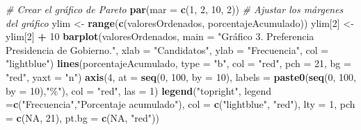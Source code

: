 \documentclass[
  12 pt,
  a4paper,
]{article}
\newenvironment{Shaded}{\begin{snugshade}}{\end{snugshade}}
\newcommand{\AttributeTok}[1]{\textcolor[rgb]{0.13,0.29,0.53}{#1}}
\newcommand{\CommentTok}[1]{\textcolor[rgb]{0.56,0.35,0.01}{\textit{#1}}}
\newcommand{\ConstantTok}[1]{\textcolor[rgb]{0.56,0.35,0.01}{#1}}
\newcommand{\DecValTok}[1]{\textcolor[rgb]{0.00,0.00,0.81}{#1}}
\newcommand{\FunctionTok}[1]{\textcolor[rgb]{0.13,0.29,0.53}{\textbf{#1}}}
\newcommand{\NormalTok}[1]{#1}
\newcommand{\OtherTok}[1]{\textcolor[rgb]{0.56,0.35,0.01}{#1}}
\newcommand{\SpecialCharTok}[1]{\textcolor[rgb]{0.81,0.36,0.00}{\textbf{#1}}}
\newcommand{\StringTok}[1]{\textcolor[rgb]{0.31,0.60,0.02}{#1}}
\begin{document}
\begin{Shaded}
\begin{Highlighting}[]
\CommentTok{\# Crear el gráfico de Pareto}
\FunctionTok{par}\NormalTok{(}\AttributeTok{mar =} \FunctionTok{c}\NormalTok{(}\DecValTok{1}\NormalTok{, }\DecValTok{2}\NormalTok{, }\DecValTok{10}\NormalTok{, }\DecValTok{2}\NormalTok{))  }\CommentTok{\# Ajustar los márgenes del gráfico}
\NormalTok{ylim }\OtherTok{\textless{}{-}} \FunctionTok{range}\NormalTok{(}\FunctionTok{c}\NormalTok{(valoresOrdenados, porcentajeAcumulado))}
\NormalTok{ylim[}\DecValTok{2}\NormalTok{] }\OtherTok{\textless{}{-}}\NormalTok{ ylim[}\DecValTok{2}\NormalTok{] }\SpecialCharTok{+} \DecValTok{10}
\FunctionTok{barplot}\NormalTok{(valoresOrdenados, }
        \AttributeTok{main =} \StringTok{"Gráfico 3. Preferencia Presidencia de Gobierno."}\NormalTok{, }
        \AttributeTok{xlab =} \StringTok{"Candidatos"}\NormalTok{, }\AttributeTok{ylab =} \StringTok{"Frecuencia"}\NormalTok{, }\AttributeTok{col =} \StringTok{"lightblue"}\NormalTok{)}
        \FunctionTok{lines}\NormalTok{(porcentajeAcumulado, }
                \AttributeTok{type =} \StringTok{"b"}\NormalTok{, }\AttributeTok{col =} \StringTok{"red"}\NormalTok{, }\AttributeTok{pch =} \DecValTok{21}\NormalTok{, }\AttributeTok{bg =} \StringTok{"red"}\NormalTok{, }\AttributeTok{yaxt =} \StringTok{"n"}\NormalTok{)}
        \FunctionTok{axis}\NormalTok{(}\DecValTok{4}\NormalTok{, }\AttributeTok{at =} \FunctionTok{seq}\NormalTok{(}\DecValTok{0}\NormalTok{, }\DecValTok{100}\NormalTok{, }\AttributeTok{by =} \DecValTok{10}\NormalTok{), }
                \AttributeTok{labels =} \FunctionTok{paste0}\NormalTok{(}\FunctionTok{seq}\NormalTok{(}\DecValTok{0}\NormalTok{, }\DecValTok{100}\NormalTok{, }\AttributeTok{by =} \DecValTok{10}\NormalTok{),}\StringTok{"\%"}\NormalTok{),}
                \AttributeTok{col =} \StringTok{"red"}\NormalTok{, }\AttributeTok{las =} \DecValTok{1}\NormalTok{)}
        \FunctionTok{legend}\NormalTok{(}\StringTok{"topright"}\NormalTok{, }\AttributeTok{legend =}\FunctionTok{c}\NormalTok{(}\StringTok{"Frecuencia"}\NormalTok{,}\StringTok{"Porcentaje acumulado"}\NormalTok{),}
                \AttributeTok{col =} \FunctionTok{c}\NormalTok{(}\StringTok{"lightblue"}\NormalTok{, }\StringTok{"red"}\NormalTok{),}
                \AttributeTok{lty =} \DecValTok{1}\NormalTok{, }\AttributeTok{pch =} \FunctionTok{c}\NormalTok{(}\ConstantTok{NA}\NormalTok{, }\DecValTok{21}\NormalTok{), }\AttributeTok{pt.bg =} \FunctionTok{c}\NormalTok{(}\ConstantTok{NA}\NormalTok{, }\StringTok{"red"}\NormalTok{))}
\end{Highlighting}
\end{Shaded}
\end{document}
